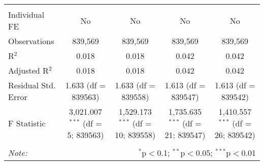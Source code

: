\documentclass[
]{article}
\begin{document}
\begin{table}[!htbp]
{\begin{tabular}{@{\extracolsep{5pt}}lcccc}
\hline \\[-1.8ex] 
Individual FE & No & No & No & No \\ 
Observations & 839,569 & 839,569 & 839,569 & 839,569 \\ 
R$^{2}$ & 0.018 & 0.018 & 0.042 & 0.042 \\ 
Adjusted R$^{2}$ & 0.018 & 0.018 & 0.042 & 0.042 \\ 
Residual Std. Error & 1.633 (df = 839563) & 1.633 (df = 839558) & 1.613 (df = 839547) & 1.613 (df = 839542) \\ 
F Statistic & 3,021.007$^{***}$ (df = 5; 839563) & 1,529.173$^{***}$ (df = 10; 839558) & 1,735.635$^{***}$ (df = 21; 839547) & 1,410.557$^{***}$ (df = 26; 839542) \\ 
\hline 
\hline \\[-1.8ex] 
\textit{Note:}  & \multicolumn{4}{r}{$^{*}$p$<$0.1; $^{**}$p$<$0.05; $^{***}$p$<$0.01} \\ 
\end{tabular}
} 
\end{table} 
\newpage
\end{document}
